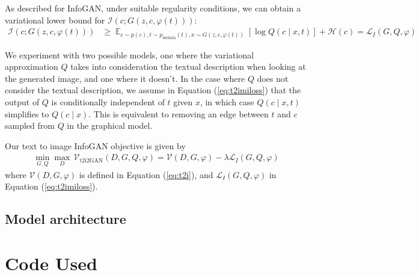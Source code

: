 \documentclass{article}
\DeclareMathOperator*{\E}{\mathbb{E}}
\begin{document}
As described for InfoGAN, under suitable regularity conditions, we can obtain a variational lower bound for $\mathcal{I}(c;G(z,c,\varphi(t)))$:
\begin{align}
\mathcal{I}(c;G(z,c, \varphi(t))) &\geq \E_{c\sim p(c), t\sim p_{\text{intdata}}(t), x\sim G(z,c, \varphi(t))}\left[\log Q(c\mid x,t)\right] + \mathcal{H}(c) = \mathcal{L}_I(G,Q,\varphi) \label{eq:t2imiloss}
\end{align}

We experiment with two possible models, one where the variational approximation $Q$ takes into consideration the textual description when looking at the generated image, and one where it doesn't. In the case where $Q$ does not consider the textual description, we assume in Equation (\ref{eq:t2imiloss}) that the output of $Q$ is conditionally independent of $t$ given $x$, in which case $Q(c\mid x,t)$ simplifies to $Q(c\mid x)$. This is equivalent to removing an edge between $t$ and $c$ sampled from $Q$ in the graphical model.

Our text to image InfoGAN objective is given by
\begin{align}
\min_{G,Q} \max_D\, \mathcal{V}_{\text{t2i2GAN}}(D,G,Q,\varphi) = \mathcal{V}(D,G,\varphi) - \lambda \mathcal{L}_I(G,Q,\varphi)
\end{align}
where $\mathcal{V}(D,G,\varphi)$ is defined in Equation (\ref{eq:t2i}), and $\mathcal{L}_I(G,Q,\varphi)$ in Equation (\ref{eq:t2imiloss}).


\subsection{Model architecture}





\section{Code Used}
\end{document}
